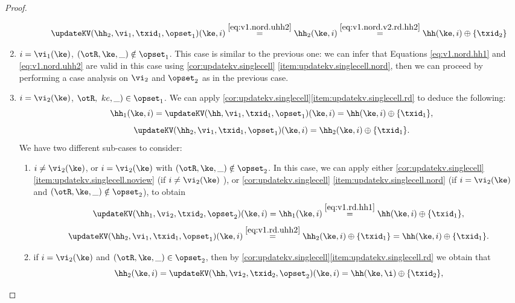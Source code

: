 \begin{proof}
\begin{enumerate}
\begin{enumerate}
\[\begin{array}{l}
\updateKV(\hh_2,\vi_1, \txid_1,\opset_1)(\ke, i) \stackrel{\eqref{eq:v1.nord.uhh2}}{=} \hh_2(\ke, i) \stackrel{\eqref{eq:v1.nord.v2.rd.hh2}} = \hh(\ke, i) \oplus \{\txid_2\}
\end{array}
\]
\end{enumerate}
\item $i = \vi_1(\ke)$, $(\otR, \ke, \_) \notin \opset_1$. This case is similar to the previous one: we can infer 
that Equations \eqref{eq:v1.nord.hh1} and \eqref{eq:v1.nord.uhh2} are valid in this case using \cref{cor:updatekv.singlecell}
\eqref{item:updatekv.singlecell.nord}, then we can proceed by performing a case analysis on $\vi_2$ and $\opset_2$ as in the previous case.
\item $i = \vi_2(\ke)$, $\otR,\ ke, \_) \in \opset_1$. We can apply \cref{cor:updatekv.singlecell}\eqref{item:updatekv.singlecell.rd} 
to deduce the following: 
\begin{equation}
\hh_1(\ke, i) = \updateKV(\hh, \vi_1, \txid_1, \opset_1)(\ke, i) = \hh(\ke, i) \oplus \{\txid_1\},
\label{eq:v1.rd.hh1}
\end{equation}
\begin{equation}
\updateKV(\hh_2, \vi_1, \txid_1, \opset_1)(\ke, i) = \hh_2(\ke, i) \oplus \{\txid_1\}. 
\label{eq:v1.rd.uhh2}
\end{equation}
We have two different sub-cases to consider: 
\begin{enumerate}
\item $i \neq \vi_2(\ke)$, or $i = \vi_2(\ke)$ with $(\otR,\ke,\_) \notin \opset_2$. In this case, we can apply either 
\cref{cor:updatekv.singlecell}\eqref{item:updatekv.singlecell.noview} (if $i \neq \vi_2(\ke)$ ), or 
\cref{cor:updatekv.singlecell} \eqref{item:updatekv.singlecell.nord} (if $i = \vi_2(\ke)$ and $(\otR, \ke, \_) \notin \opset_2$), 
to obtain 
\[
\updateKV(\hh_1, \vi_2, \txid_2, \opset_2)(\ke, i) = \hh_1(\ke, i) \stackrel{\eqref{eq:v1.rd.hh1}}{=} \hh(\ke, i) \oplus \{\txid_1\},
\]
\[
\updateKV(\hh_2, \vi_1, \txid_1, \opset_1)(\ke, i) \stackrel{\eqref{eq:v1.rd.uhh2}}{=} \hh_2(\ke, i) \oplus \{ \txid_1 \} = 
\hh(\ke, i) \oplus \{ \txid_1 \}.
\]
\item if $i = \vi_2(\ke)$ and $(\otR, \ke, \_) \in \opset_2$, then by \cref{cor:updatekv.singlecell}\eqref{item:updatekv.singlecell.rd} 
we obtain that 
\begin{equation}
\hh_2(\ke, i) = \updateKV(\hh, \vi_2, \txid_2, \opset_2)(\ke, i) = \hh(\ke, \i) \oplus \{\txid_2\},
\label{eq:v1.rd.v2.rd.hh2}
\end{equation}

\end{enumerate}
\end{enumerate}
\end{proof}
